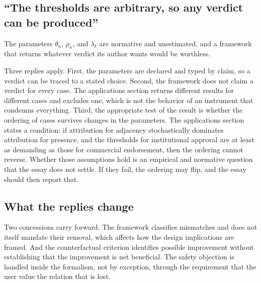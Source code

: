 \subsection{``The thresholds are arbitrary, so any verdict can be produced''}

The parameters $\theta_\kappa$, $\rho_\kappa$, and $\lambda_t$ are normative and unestimated, and a framework that returns whatever verdict its author wants would be worthless.

Three replies apply. First, the parameters are declared and typed by claim, so a verdict can be traced to a stated choice. Second, the framework does not claim a verdict for every case. The applications section returns different results for different cases and excludes one, which is not the behavior of an instrument that condemns everything. Third, the appropriate test of the result is whether the ordering of cases survives changes in the parameters. The applications section states a condition: if attribution for adjacency stochastically dominates attribution for presence, and the thresholds for institutional approval are at least as demanding as those for commercial endorsement, then the ordering cannot reverse. Whether those assumptions hold is an empirical and normative question that the essay does not settle. If they fail, the ordering may flip, and the essay should then report that.

\subsection{What the replies change}

Two concessions carry forward. The framework classifies mismatches and does not itself mandate their removal, which affects how the design implications are framed. And the counterfactual criterion identifies possible improvement without establishing that the improvement is net beneficial. The safety objection is handled inside the formalism, not by exception, through the requirement that the user value the relation that is lost.
